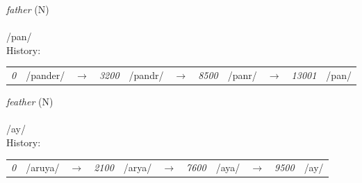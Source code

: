\vspace{15pt}
\begin{nopagebreak}
 \textit{father} (N)\\
\\
\noindent /p{\textprimstress}an/\\


\noindent History:

\vspace{-0pt}
\hspace{40pt}
\begin{tabular}{ccc}
\textit{0} & /pander/&$\rightarrow$ & \textit{3200} & /pandr/&$\rightarrow$ & \textit{8500} & /panr/&$\rightarrow$ & \textit{13001} & /pan/& \\
\end{tabular}

\vspace{20pt}\hline

\end{nopagebreak}
\filbreak



\vspace{15pt}
\begin{nopagebreak}
 \textit{feather} (N)\\
\\
\noindent /{\textprimstress}ay/\\


\noindent History:

\vspace{-0pt}
\hspace{40pt}
\begin{tabular}{ccc}
\textit{0} & /aruya/&$\rightarrow$ & \textit{2100} & /arya/&$\rightarrow$ & \textit{7600} & /aya/&$\rightarrow$ & \textit{9500} & /ay/& \\
\end{tabular}

\vspace{20pt}\hline

\end{nopagebreak}
\filbreak



